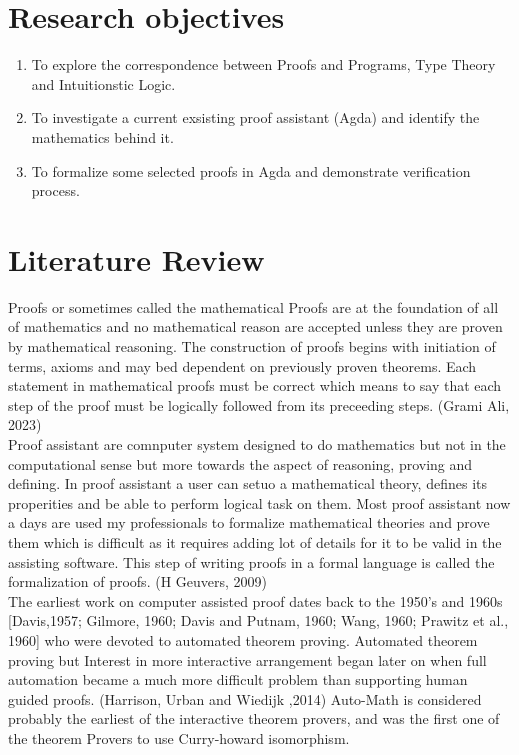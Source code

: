 \documentclass{article}
\begin{document}
\section{Research objectives}
\begin{enumerate}
    \item To explore the correspondence between Proofs and Programs, Type Theory and Intuitionstic Logic.
    \item To investigate a current exsisting proof assistant (Agda) and identify the mathematics behind it.
    \item To formalize some selected proofs in Agda and demonstrate verification process.
\end{enumerate}
\section{Literature Review}
Proofs or sometimes called the mathematical Proofs are at the foundation of all of mathematics and no mathematical reason are accepted unless they are proven by mathematical reasoning. The construction of proofs begins with initiation of terms, axioms and may bed dependent on previously proven
theorems. Each statement in mathematical proofs must be correct which means to say that each step of the proof must be logically followed from its preceeding steps. (Grami Ali, 2023)\\
Proof assistant are comnputer system designed to do mathematics but not in the computational sense but more towards the aspect of reasoning, proving and defining.
In proof assistant a user can setuo a mathematical theory, defines its properities and be able to perform logical task on them.
Most proof assistant now a days are used my professionals to formalize mathematical theories and prove them which is difficult as it requires adding lot of details for it to be valid
in the assisting software. This step of writing proofs in a formal language is called the formalization of proofs. (H Geuvers, 2009)  \\ 
The earliest work on computer assisted proof dates back to the 1950's and 1960s 
[Davis,1957; Gilmore, 1960; Davis and Putnam, 1960; Wang, 1960; Prawitz et al., 1960] who were devoted to automated theorem proving. 
Automated theorem proving but Interest in more interactive arrangement began later on when full automation became a much more difficult problem than supporting human guided proofs. (Harrison, Urban and Wiedijk ,2014) 
Auto-Math is considered probably the earliest of the interactive theorem provers, and was the first one of the theorem Provers to use Curry-howard isomorphism.
\end{document}
